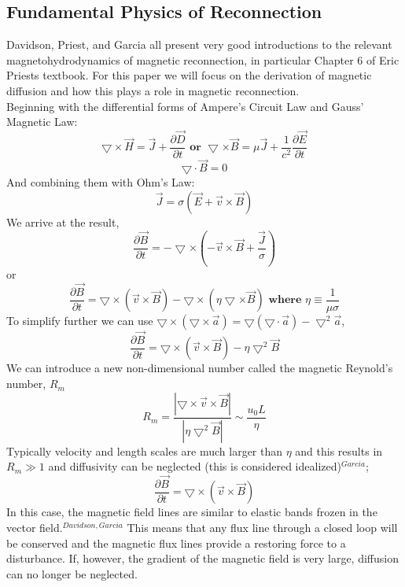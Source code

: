 \documentclass{article}
\begin{document}
\subsection{Fundamental Physics of Reconnection}
Davidson, Priest, and Garcia all present very good introductions to the relevant magnetohydrodynamics of magnetic reconnection, in particular Chapter 6 of Eric Priests textbook.  For this paper we will focus on the derivation of magnetic diffusion and how this plays a role in magnetic reconnection.\\
Beginning with the differential forms of Ampere's Circuit Law and Gauss' Magnetic Law:
$$\bigtriangledown \times \vec{H}=\vec{J}+\frac{\partial \vec{D}}{\partial t} \textbf{ or } \bigtriangledown \times \vec{B}=\mu\vec{J}+\frac{1}{c^2}\frac{\partial \vec{E}}{\partial t}$$
$$\bigtriangledown \cdot \vec{B} = 0$$
And combining them with Ohm's Law:
$$\vec{J}=\sigma\left(\vec{E}+\vec{v}\times\vec{B}\right)$$
We arrive at the result,
$$\frac{\partial\vec{B}}{\partial t}=-\bigtriangledown\times\left(-\vec{v}\times\vec{B}+\frac{\vec{J}}{\sigma}\right)$$
or
$$\frac{\partial\vec{B}}{\partial t}=\bigtriangledown\times\left(\vec{v}\times\vec{B}\right)-\bigtriangledown\times\left(\eta\bigtriangledown\times\vec{B}\right) \textbf{ where }\eta\equiv\frac{1}{\mu\sigma}$$
To simplify further we can use $\bigtriangledown\times\left(\bigtriangledown\times\vec{a}\right)=\bigtriangledown\left(\bigtriangledown\cdot\vec{a}\right)-\bigtriangledown^2\vec{a}$,
$$\frac{\partial\vec{B}}{\partial t}=\bigtriangledown\times\left(\vec{v}\times\vec{B}\right)-\eta\bigtriangledown^2\vec{B}$$
We can introduce a new non-dimensional number called the magnetic Reynold's number, $R_m$
$$R_m=\frac{\left|\bigtriangledown\times\vec{v}\times\vec{B}\right|}{\left|\eta\bigtriangledown^2\vec{B}\right|}\sim\frac{u_0 L}{\eta}$$
Typically velocity and length scales are much larger than $\eta$ and this results in $R_m\gg1$ and diffusivity can be neglected (this is considered idealized)$^{Garcia}$;
$$\frac{\partial\vec{B}}{\partial t}=\bigtriangledown\times\left(\vec{v}\times\vec{B}\right)$$
In this case, the magnetic field lines are similar to elastic bands frozen in the vector field.$^{Davidson, Garcia}$  This means that any flux line through a closed loop will be conserved and the magnetic flux lines provide a restoring force to a disturbance.  If, however, the gradient of the magnetic field is very large, diffusion can no longer be neglected.\\\\
\end{document}
